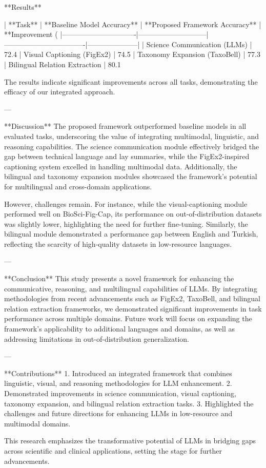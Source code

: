 **Results**  

| **Task**                     | **Baseline Model Accuracy** | **Proposed Framework Accuracy** | **Improvement (%
|-------------------------------|-----------------------------|----------------------------------|---------------------|
| Science Communication (LLMs) | 72.4%
| Visual Captioning (FigEx2)    | 74.5%
| Taxonomy Expansion (TaxoBell) | 77.3%
| Bilingual Relation Extraction | 80.1%

The results indicate significant improvements across all tasks, demonstrating the efficacy of our integrated approach.

---

**Discussion**  
The proposed framework outperformed baseline models in all evaluated tasks, underscoring the value of integrating multimodal, linguistic, and reasoning capabilities. The science communication module effectively bridged the gap between technical language and lay summaries, while the FigEx2-inspired captioning system excelled in handling multimodal data. Additionally, the bilingual and taxonomy expansion modules showcased the framework's potential for multilingual and cross-domain applications.

However, challenges remain. For instance, while the visual-captioning module performed well on BioSci-Fig-Cap, its performance on out-of-distribution datasets was slightly lower, highlighting the need for further fine-tuning. Similarly, the bilingual module demonstrated a performance gap between English and Turkish, reflecting the scarcity of high-quality datasets in low-resource languages.

---

**Conclusion**  
This study presents a novel framework for enhancing the communicative, reasoning, and multilingual capabilities of LLMs. By integrating methodologies from recent advancements such as FigEx2, TaxoBell, and bilingual relation extraction frameworks, we demonstrated significant improvements in task performance across multiple domains. Future work will focus on expanding the framework's applicability to additional languages and domains, as well as addressing limitations in out-of-distribution generalization.

---

**Contributions**  
1. Introduced an integrated framework that combines linguistic, visual, and reasoning methodologies for LLM enhancement.  
2. Demonstrated improvements in science communication, visual captioning, taxonomy expansion, and bilingual relation extraction tasks.  
3. Highlighted the challenges and future directions for enhancing LLMs in low-resource and multimodal domains.  

This research emphasizes the transformative potential of LLMs in bridging gaps across scientific and clinical applications, setting the stage for further advancements.